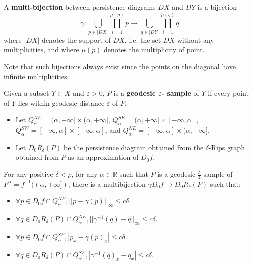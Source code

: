 \documentclass{beamer}
\theoremstyle{definition}
\newcommand{\R}{\mathbb{R}}
\begin{document}
\begin{frame}
\begin{definition}
A \textbf{multi-bijection} between persistence diagrams $DX$ and $DY$ is a bijection
\[
\gamma:\bigcup_{p\in|DX|}\coprod_{i=1}^{\mu(p)}p\to \bigcup_{q\in|DY|}\coprod_{i=1}^{\mu(q)}q
\]
where $|DX|$ denotes the support of $DX$, i.e. the set $DX$ without any multiplicities, and where $\mu(p)$ denotes the multiplicity of point. 
\end{definition}\pause 
Note that such bijections always exist since the points on the diagonal have
infinite multiplicities. %
\end{frame}

\begin{frame}
\begin{definition}
Given a subset $Y \subset X$ and $\varepsilon > 0$, $P$ is a \textbf{geodesic $\varepsilon$-
sample} of $Y$ if every point of $Y$ lies within geodesic distance $\varepsilon$ of $P$.
\end{definition}
\begin{itemize}
\item<2> Let $Q_\alpha^{NE}= (\alpha,+\infty]\times (\alpha,+\infty]$, $Q_\alpha^{SE}=(\alpha,+\infty]\times[-\infty,\alpha]$, $Q_\alpha^{SW}=[-\infty,\alpha]\times[-\infty,\alpha]$, and $Q_\alpha^{NE}=[-\infty,\alpha]\times(\alpha,+\infty]$. %

\item<3-> Let $D_0R_\delta(P)$ be the persistence diagram obtained from the $\delta$-Rips graph obtained from $P$ as an approximation of $D_0f$.
\end{itemize}
\end{frame}

\begin{frame}
\begin{theorem}
For any positive $\delta < \rho$, for
any $\alpha\in \R$ such that $P$ is a geodesic $\frac{\delta}{4}$-sample of $F^\alpha=f^{-1}((\alpha,+\infty])$, there is a multibijection $\gamma D_0f \to D_0R_\delta(P)$ such that:
\begin{itemize}
\item $\forall p\in D_0f\cap Q_\alpha^{NE}, ||p-\gamma(p)||_{\infty}\leq c\delta$.
\item $\forall q\in D_0R_\delta(P)\cap Q_\alpha^{NE}, ||\gamma^{-1}(q)-q||_{\infty}\leq c\delta$.
\item $\forall p\in D_0f\cap Q_\alpha^{SE}, |p_x-\gamma(p)_x|\leq c\delta$.
\item $\forall q\in D_0R_\delta(P)\cap Q_\alpha^{SE}, |\gamma^{-1}(q)_x-q_x|\leq c\delta$.
\end{itemize}
\end{theorem}
\end{frame}
\end{document}
